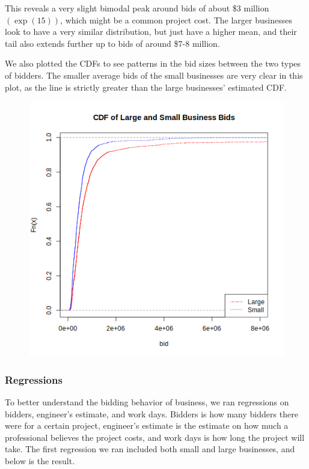 This reveals a very slight bimodal peak around bids of about \$3 million
$(\exp(15))$, which might be a common project cost.
The larger businesses look to have a very similar distribution, but just have
a higher mean, and their tail also extends further up to bids of around \$7-8
million.

\medskip
We also plotted the CDFs to see patterns in the bid sizes between
the two types of bidders. The smaller average bids of
the small businesses are very clear in this plot, as the line is strictly
greater than the large businesses' estimated CDF.

\begin{figure}[htb!]
    \centering
    \includegraphics[scale=0.7]{imgs/cdf.png}
\end{figure}

\newpage
\subsubsection{Regressions}

To better understand the bidding behavior of business, we ran regressions on
bidders, engineer’s estimate, and work days. Bidders is how many bidders there
were for a certain project, engineer’s estimate is the estimate on how much a
professional believes the project costs, and work days is how long the project
will take. The first regression we ran included both small and large
businesses, and below is the result.

